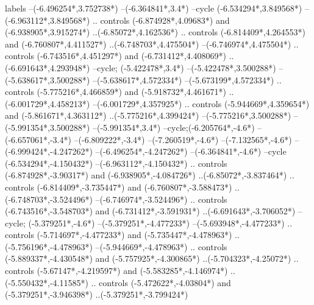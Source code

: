 {\begin{scope}[x=1mm,y=1mm,line width=\SCstroke mm,line cap=round,line join=round]
\begin{SCpart}{labels}
--({-6.496254*\SCF},{3.752738*\SCF})
--({-6.364841*\SCF},{3.4*\SCF})
--cycle
({-6.534294*\SCF},{3.849568*\SCF})
--({-6.963112*\SCF},{3.849568*\SCF})
.. controls ({-6.874928*\SCF},{4.09683*\SCF}) and ({-6.938905*\SCF},{3.915274*\SCF}) ..({-6.85072*\SCF},{4.162536*\SCF})
.. controls ({-6.814409*\SCF},{4.264553*\SCF}) and ({-6.760807*\SCF},{4.411527*\SCF}) ..({-6.748703*\SCF},{4.475504*\SCF})
--({-6.746974*\SCF},{4.475504*\SCF})
.. controls ({-6.743516*\SCF},{4.451297*\SCF}) and ({-6.731412*\SCF},{4.408069*\SCF}) ..({-6.691643*\SCF},{4.293948*\SCF})
--cycle;
 ({-5.422478*\SCF},{3.4*\SCF})
--({-5.422478*\SCF},{3.500288*\SCF})
--({-5.638617*\SCF},{3.500288*\SCF})
--({-5.638617*\SCF},{4.572334*\SCF})
--({-5.673199*\SCF},{4.572334*\SCF})
.. controls ({-5.775216*\SCF},{4.466859*\SCF}) and ({-5.918732*\SCF},{4.461671*\SCF}) ..({-6.001729*\SCF},{4.458213*\SCF})
--({-6.001729*\SCF},{4.357925*\SCF})
.. controls ({-5.944669*\SCF},{4.359654*\SCF}) and ({-5.861671*\SCF},{4.363112*\SCF}) ..({-5.775216*\SCF},{4.399424*\SCF})
--({-5.775216*\SCF},{3.500288*\SCF})
--({-5.991354*\SCF},{3.500288*\SCF})
--({-5.991354*\SCF},{3.4*\SCF})
--cycle; ({-6.205764*\SCF},{-4.6*\SCF})
--({-6.657061*\SCF},{-3.4*\SCF})
--({-6.809222*\SCF},{-3.4*\SCF})
--({-7.260519*\SCF},{-4.6*\SCF})
--({-7.132565*\SCF},{-4.6*\SCF})
--({-6.999424*\SCF},{-4.247262*\SCF})
--({-6.496254*\SCF},{-4.247262*\SCF})
--({-6.364841*\SCF},{-4.6*\SCF})
--cycle
({-6.534294*\SCF},{-4.150432*\SCF})
--({-6.963112*\SCF},{-4.150432*\SCF})
.. controls ({-6.874928*\SCF},{-3.90317*\SCF}) and ({-6.938905*\SCF},{-4.084726*\SCF}) ..({-6.85072*\SCF},{-3.837464*\SCF})
.. controls ({-6.814409*\SCF},{-3.735447*\SCF}) and ({-6.760807*\SCF},{-3.588473*\SCF}) ..({-6.748703*\SCF},{-3.524496*\SCF})
--({-6.746974*\SCF},{-3.524496*\SCF})
.. controls ({-6.743516*\SCF},{-3.548703*\SCF}) and ({-6.731412*\SCF},{-3.591931*\SCF}) ..({-6.691643*\SCF},{-3.706052*\SCF})
--cycle;
 ({-5.379251*\SCF},{-4.6*\SCF})
--({-5.379251*\SCF},{-4.477233*\SCF})
--({-5.693948*\SCF},{-4.477233*\SCF})
.. controls ({-5.714697*\SCF},{-4.477233*\SCF}) and ({-5.735447*\SCF},{-4.478963*\SCF}) ..({-5.756196*\SCF},{-4.478963*\SCF})
--({-5.944669*\SCF},{-4.478963*\SCF})
.. controls ({-5.889337*\SCF},{-4.430548*\SCF}) and ({-5.757925*\SCF},{-4.300865*\SCF}) ..({-5.704323*\SCF},{-4.25072*\SCF})
.. controls ({-5.67147*\SCF},{-4.219597*\SCF}) and ({-5.583285*\SCF},{-4.146974*\SCF}) ..({-5.550432*\SCF},{-4.11585*\SCF})
.. controls ({-5.472622*\SCF},{-4.03804*\SCF}) and ({-5.379251*\SCF},{-3.946398*\SCF}) ..({-5.379251*\SCF},{-3.799424*\SCF})

\end{SCpart}
\end{scope}}
